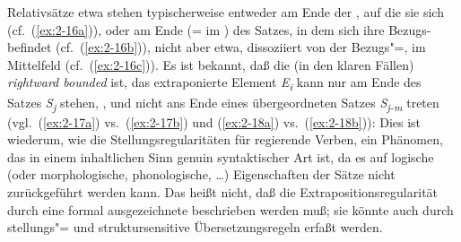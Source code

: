 \documentclass[output=paper]{langsci/langscibook}
\begin{document}
Relativsätze etwa stehen typischerweise entweder am Ende der , auf die sie sich  (cf.\ (\ref{ex:2-16a})), oder am Ende (= im ) des Satzes, in dem sich ihre Bezugs- befindet (cf.\ (\ref{ex:2-16b})), nicht aber etwa, dissoziiert von der Bezugs"=, im Mittelfeld (cf.\ (\ref{ex:2-16c})).
\eal
	 \label{ex:2-16a}
	 \label{ex:2-16b}
	 \label{ex:2-16c}
\zl
Es ist bekannt, daß die  (in den klaren Fällen) \textit{rightward bounded} ist, \dash das extraponierte Element \textit{E\textsubscript{i}} kann nur am Ende des Satzes \textit{S\textsubscript{j}} stehen, , und nicht ans Ende eines übergeordneten Satzes \textit{S\textsubscript{j-m}} treten (vgl.\ (\ref{ex:2-17a}) vs.\  (\ref{ex:2-17b}) und (\ref{ex:2-18a}) vs.\  (\ref{ex:2-18b})):
\eal \label{ex:2-17}
	 \label{ex:2-17a}
	 \label{ex:2-17b}
\zl
\eal \label{ex:2-18}
	 \label{ex:2-18a}
	 \label{ex:2-18b}
\zl 
Dies ist wiederum, wie die Stellungsregularitäten für regierende Verben, ein Phänomen, das in einem inhaltlichen Sinn genuin syntaktischer Art ist, da es auf logische (oder morphologische, phonologische,  \ldots{}) Eigenschaften der Sätze nicht zurückgeführt werden kann. Das heißt nicht, daß die Extrapositionsregularität durch eine formal ausgezeichnete  beschrieben werden muß; sie könnte auch durch stellungs"= und struktursensitive Übersetzungsregeln erfaßt werden.%
\end{document}
